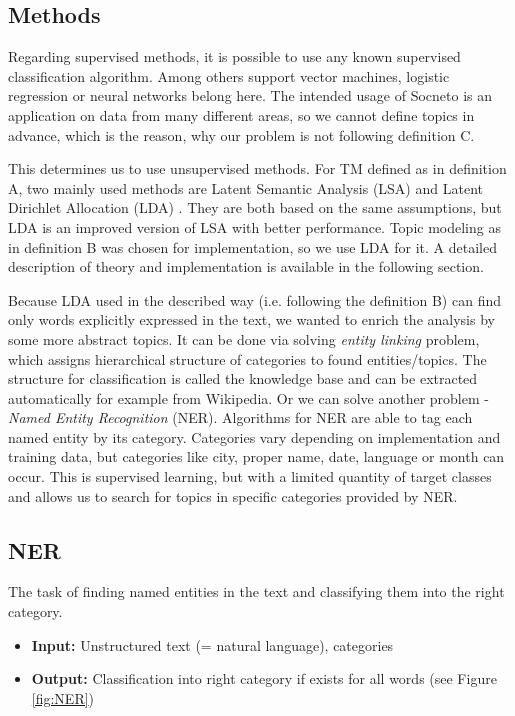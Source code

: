 \subsection{Methods}
Regarding supervised methods, it is possible to use any known supervised classification algorithm. Among others support vector machines, logistic regression or neural networks belong here. The intended usage of Socneto is an application on data from many different areas, so we cannot define topics in advance, which is the reason, why our problem is not following definition C. \par This determines us to use unsupervised methods. For TM defined as in definition A, two mainly used methods are Latent Semantic Analysis (LSA) \cite{LSA} and Latent Dirichlet Allocation (LDA) \cite{LDA}. They are both based on the same assumptions, but LDA is an improved version of LSA with better performance. Topic modeling as in definition B was chosen for implementation, so we use LDA for it. A detailed description of theory and implementation is available in the following section. \par
Because LDA used in the described way (i.e. following the definition B) can find only words explicitly expressed in the text, we wanted to enrich the analysis by some more abstract topics. It can be done via solving \textit{entity linking} problem, which assigns hierarchical structure of categories to found entities/topics. The structure for classification is called the knowledge base and can be extracted automatically for example from Wikipedia. Or we can solve another problem - \textit{Named Entity Recognition} (NER). Algorithms for NER are able to tag each named entity by its category. Categories vary depending on implementation and training data, but categories like city, proper name, date, language or month can occur. This is supervised learning, but with a limited quantity of target classes and allows us to search for topics in specific categories provided by NER.
\par

\subsection{NER}
The task of finding named entities in the text and classifying them into the right category.
   \begin{itemize}
      \item \textbf{Input:} Unstructured text (= natural language), categories
      \item \textbf{Output:} Classification into right category if exists for all words (see Figure \ref{fig:NER})
    \end{itemize}
    

